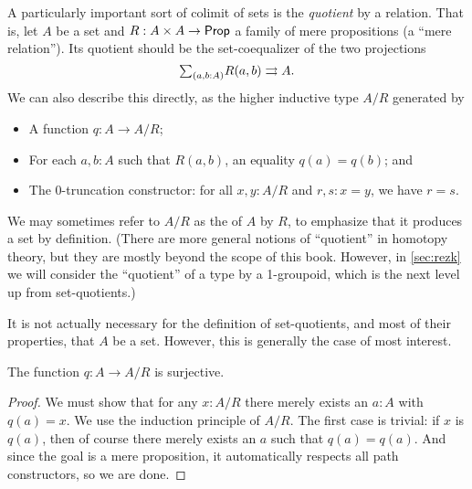 A particularly important sort of colimit of sets is the \emph{quotient} by a relation.
That is, let $A$ be a set and $R:A\times A \to \mathsf{Prop}$ a family of mere propositions (a ``mere relation'').
Its quotient should be the set-coequalizer of the two projections
\[ \tsm{a,b:A} R(a,b) \rightrightarrows A. \]
We can also describe this directly, as the higher inductive type $A/R$ generated by
%
%
%
\begin{itemize}
\item A function $q:A\to A/R$;
\item For each $a,b:A$ such that $R(a,b)$, an equality $q(a)=q(b)$; and
\item The $0$-truncation constructor: for all $x,y:A/R$ and $r,s:x=y$, we have $r=s$.
\end{itemize}
We may sometimes refer to $A/R$ as the  of $A$ by $R$, to emphasize that it produces a set by definition.
(There are more general notions of ``quotient'' in homotopy theory, but they are mostly beyond the scope of this book.
However, in \autoref{sec:rezk} we will consider the ``quotient'' of a type by a 1-groupoid, which is the next level up from set-quotients.)

\begin{rmk}
  It is not actually necessary for the definition of set-quotients, and most of their properties, that $A$ be a set.
  However, this is generally the case of most interest.
\end{rmk}

\begin{lem}\label{thm:quotient-surjective}
  The function $q:A\to A/R$ is surjective.
\end{lem}
\begin{proof}
  We must show that for any $x:A/R$ there merely exists an $a:A$ with $q(a)=x$.
  We use the induction principle of $A/R$.
  The first case is trivial: if $x$ is $q(a)$, then of course there merely exists an $a$ such that $q(a)=q(a)$.
  And since the goal is a mere proposition, it automatically respects all path constructors, so we are done.
\end{proof}

